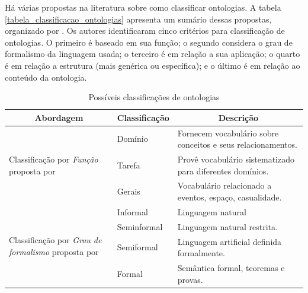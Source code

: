 Há várias propostas na literatura sobre como classificar ontologias. A tabela \ref{tabela_classificacao_ontologias} apresenta um sumário dessas propostas, organizado por . Os autores identificaram cinco critérios para classificação de ontologias. O primeiro é baseado em sua função; o segundo considera o grau de formalismo da linguagem usada; o terceiro é em relação a sua aplicação; o quarto é em relação a estrutura (mais genérica ou específica); e o último é em relação ao conteúdo da ontologia.
\bgroup
\def\arraystretch{2}
\begin{table}[htb]
\tiny
\centering
\caption{Possíveis classificações de ontologias}
\begin{tabular}{|l|l|l|}  \hline
\multicolumn{1}{|c}{\textbf{Abordagem}} & \multicolumn{1}{|c|}{\textbf{Classificação}} &  \multicolumn{1}{c|}{\textbf{Descrição}} \\  \hline
\multirow{3}{*}{\parbox{3cm}{Classificação por \emph{Função} proposta por }} 			& Domínio       		& Fornecem vocabulário sobre conceitos e seus relacionamentos. \\
				                   						& Tarefa        		& Provê vocabulário sistematizado para diferentes domínios.\\
				                   						& Gerais         		& Vocabulário relacionado a eventos, espaço, casualidade.  \\
\hline 
\multirow{4}{*}{\parbox{3cm}{Classificação por \emph{Grau de formalismo} proposta por  }} 	& Informal       		& Linguagem natural  \\ [0.1cm] 
										                & Seminformal        	& Linguagem natural restrita.     			 \\ 
										                & Semiformal         	& Linguagem artificial definida formalmente. \\ 
										                & Formal             	& Semântica formal, teoremas e provas.       \\ 
						                

\end{tabular}
\end{table}
